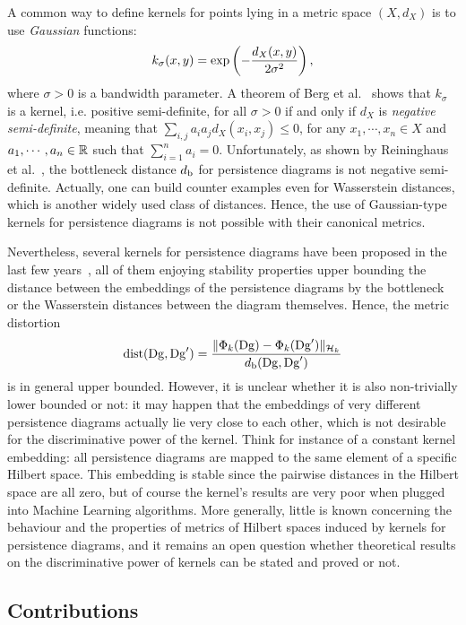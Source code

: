 A common way to define kernels for points lying in a metric space $(X,d_X)$ is to use {\em Gaussian} functions:
$$k_\sigma(x,y)={\rm exp}\left(-\frac{d_X(x,y)}{2\sigma^2}\right),$$
where $\sigma >0$ is a bandwidth parameter. A theorem of Berg et al.~\cite{Berg84} shows that $k_\sigma$ is a kernel, i.e. positive semi-definite, for all $\sigma>0$
if and only if $d_X$ is {\em negative semi-definite}, meaning that  $\sum_{i,j}a_ia_jd_X(x_i,x_j)\leq 0$, for any $x_1,\cdots,x_n\in X$ and $a_1,\cdots,a_n\in\mathbb{R}$
such that $\sum_{i=1}^n a_i=0$. Unfortunately, as shown by Reininghaus et al.~\cite{Reininghaus14}, the bottleneck distance $d_{\rm b}$ for persistence diagrams
 is not negative semi-definite. Actually, one can build
counter examples even for Wasserstein distances, which is another widely used class of distances.
Hence, the use of Gaussian-type kernels for persistence diagrams is not possible with their canonical metrics.   


Nevertheless, several kernels for persistence diagrams have been proposed in the last few years~\cite{Adams17,Bubenik15,Kusano16,Reininghaus15}, 
all of them enjoying stability properties upper bounding the distance
between the embeddings of the persistence diagrams by the bottleneck or the Wasserstein distances between the diagram themselves. 
Hence, the metric distortion $${\rm dist}(\mathrm{Dg},\mathrm{Dg}')=\frac{\|\Phi_k(\mathrm{Dg})-\Phi_k(\mathrm{Dg}')\|_{\mathcal H_k}}{d_{\rm b}(\mathrm{Dg},\mathrm{Dg}')}$$
is in general upper bounded. However, it is unclear whether it is also non-trivially lower bounded or not: it may happen that the embeddings
of very different persistence diagrams actually lie very close to each other, which is not desirable for the discriminative power of the kernel.
Think for instance of a constant kernel embedding: all persistence diagrams are mapped to the same element of a specific Hilbert space. 
This embedding is stable since the pairwise distances in the Hilbert space are all zero, but of course the kernel's results are very poor when 
plugged into Machine Learning algorithms.  
More generally, little is known concerning the behaviour and the properties of metrics of Hilbert spaces induced by kernels for persistence diagrams,
and it remains an open question whether theoretical results on the discriminative power of kernels can be stated and proved or not.     

\subsection{Contributions}

